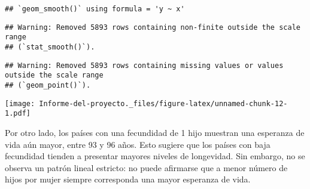 \documentclass[
]{article}
\begin{document}
\begin{verbatim}
## `geom_smooth()` using formula = 'y ~ x'
\end{verbatim}

\begin{verbatim}
## Warning: Removed 5893 rows containing non-finite outside the scale range
## (`stat_smooth()`).
\end{verbatim}

\begin{verbatim}
## Warning: Removed 5893 rows containing missing values or values outside the scale range
## (`geom_point()`).
\end{verbatim}

\texttt{[image: Informe-del-proyecto.\_files/figure-latex/unnamed-chunk-12-1.pdf]}

Por otro lado, los países con una fecundidad de 1 hijo muestran una
esperanza de vida aún mayor, entre 93 y 96 años. Esto sugiere que los
países con baja fecundidad tienden a presentar mayores niveles de
longevidad. Sin embargo, no se observa un patrón lineal estricto: no
puede afirmarse que a menor número de hijos por mujer siempre
corresponda una mayor esperanza de vida.
\end{document}
